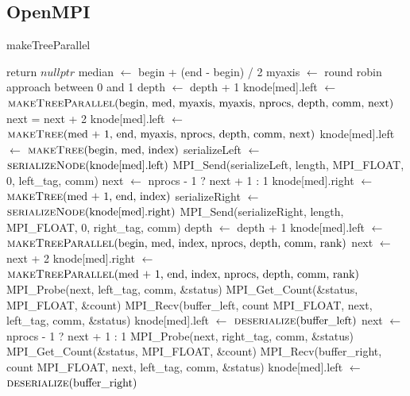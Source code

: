 \documentclass[11pt,a4paper]{article}
\begin{document}
\subsection{OpenMPI}
\begin{algorithm}[H]
\caption{makeTreeParallel}
\begin{algorithmic}[1]
	\State return $\textit{nullptr}$
\EndIf
\State median $\gets$ begin + (end - begin) / 2
\State {}
\State myaxis $\gets$ round robin approach between 0 and 1
		\State depth $\gets$ depth + 1
		\State knode[med].left $\gets$ $\Call{makeTreeParallel}{$begin, med, myaxis, myaxis, nprocs, depth, comm, next$}$
		\State next = next + 2
		\State knode[med].left $\gets$ $\Call{makeTree}{$med + 1, end, myaxis, nprocs, depth, comm, next$}$
\Else
		\State knode[med].left $\gets$ $\Call{makeTree}{$begin, med, index$}$
		\color{red}
		\State serializeLeft $\gets$ $\Call{serializeNode}{$knode[med].left$}$
		\color{black}
		\color{blue}
		\State MPI\_Send(serializeLeft, length, MPI\_FLOAT, 0, left\_tag, comm)
		\color{black}
	\EndIf
	\State next $\gets$ nprocs - 1 ? next + 1 : 1
		\State knode[med].right $\gets$ $\Call{makeTree}{$med + 1, end, index$}$
		\color{black}
\color{red}
		\State serializeRight $\gets$ $\Call{serializeNode}{$knode[med].right$}$
		\color{black}
		\color{blue}
		\State MPI\_Send(serializeRight, length, MPI\_FLOAT, 0, right\_tag, comm)
		\color{black}
	\EndIf
\EndIf
{}
		\State depth $\gets$ depth + 1
		\State knode[med].left $\gets$ $\Call{makeTreeParallel}{$begin, med, index, nprocs, depth, comm, rank$}$
		\State next $\gets$ next + 2
		\State knode[med].right $\gets$ $\Call{makeTreeParallel}{$med + 1, end, index, nprocs, depth, comm, rank$}$
	\Else 
		\color{blue}
		\State MPI\_Probe(next, left\_tag, comm, \&status)
		\State MPI\_Get\_Count(\&status, MPI\_FLOAT, \&count)
		\State MPI\_Recv(buffer\_left, count MPI\_FLOAT, next, left\_tag, comm, \&status)
		\color{red}
		\State knode[med].left $\gets$ $\Call{deserialize}{$buffer\_left$}$
		\color{black}
		\State next $\gets$ nprocs - 1 ? next + 1 : 1
		\color{blue}
		\State MPI\_Probe(next, right\_tag, comm, \&status)
		\State MPI\_Get\_Count(\&status, MPI\_FLOAT, \&count)
		\State MPI\_Recv(buffer\_right, count MPI\_FLOAT, next, left\_tag, comm, \&status)
		\color{red}
		\State knode[med].left $\gets$ $\Call{deserialize}{$buffer\_right$}$
		\color{black}
	\EndIf
\EndIf
\State \Return {}
\EndFunction
\end{algorithmic}
\end{algorithm}
\end{document}
